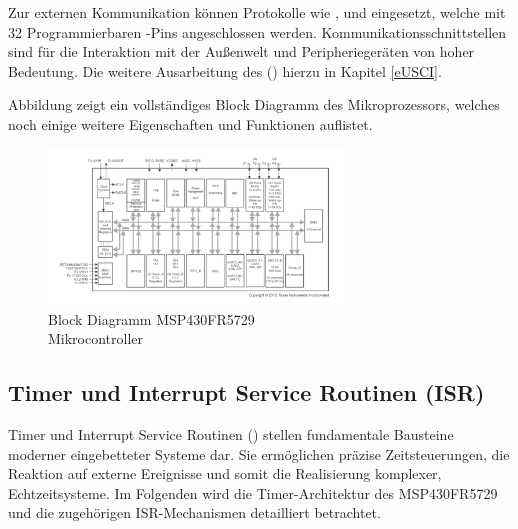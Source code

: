 Zur externen Kommunikation k\"onnen Protokolle wie ,  und  eingesetzt, welche mit 32 Programmierbaren -Pins angeschlossen werden. Kommunikationsschnittstellen sind f\"ur die Interaktion mit der Au{\ss}enwelt und Peripherieger\"aten von hoher Bedeutung. Die weitere Ausarbeitung des  () hierzu in Kapitel \ref{eUSCI}. 

Abbildung  zeigt ein vollst\"andiges Block Diagramm des Mikroprozessors, welches noch einige weitere Eigenschaften und Funktionen auflistet.

\begin{figure}[h!]
	\centering
	\includegraphics[width=0.7\textwidth]{../Bilder/FunctionalBlockDiagram_MSP430FR5729.png}
	\caption{Block Diagramm MSP430FR5729\\Mikrocontroller {}}
	\label{fig:BlockDiagramm_msp430}
\end{figure}

\subsection{Timer und Interrupt Service Routinen (ISR)}
\label{TIMER&ISR}

Timer und Interrupt Service Routinen () stellen fundamentale Bausteine moderner eingebetteter Systeme dar. Sie erm\"oglichen pr\"azise Zeitsteuerungen, die Reaktion auf externe Ereignisse und somit die Realisierung komplexer, Echtzeitsysteme. Im Folgenden wird die Timer-Architektur des MSP430FR5729 und die zugeh\"origen ISR-Mechanismen detailliert betrachtet.

